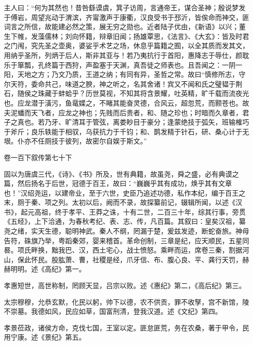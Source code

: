\documentclass[12pt,UTF8]{ctexbook}
\begin{document}
主人曰：“何为其然也！昔咎繇谟虞，箕子访周，言通帝王，谋合圣神；殷说梦发于傅岩，周望兆动于渭滨，齐甯激声于康衢，汉良受书于邳沂，皆俟命而神交，匪词言之所信，故能建必然之策，展无穷之勋也。近者陆子优由，《新语》以兴；董生下帷，发藻儒林；刘向怀籍，辩章旧闻；扬雄覃思，《法言》、《大玄》：皆及时君之门闱，究先圣之壶奥，婆娑乎术艺之场，休息乎篇籍之囿，以全其质而发其文，用纳乎圣所，列炳于后人，斯非其亚与！若乃夷抗行于首阳，惠降志于辱仕，颜耽乐于箪瓢，孔终篇于西狩，声盈塞于天渊，真吾徒之师表也。且吾闻之：一阴一阳，天地之方；乃文乃质，王道之纳；有同有异，圣哲之常。故曰“慎修所志，守尔天符，委命共己，味道之腴，神之听之，名其舍诸！宾又不闻和氏之璧韫于荆石，随侯之珠藏于蚌蛤乎？历世莫视，不知其将含景耀，吐英精，旷千载而流夜光也。应龙潜于潢污，鱼鼋媟之，不睹其能奋灵德，合风云，超忽荒，而颢苍也。故夫泥蟠而天飞者，应龙之神也；先贱而后贵者，和、随之珍也；时暗而久章者，君子之真也。若乃牙、旷清耳于管弦，离娄眇目于豪分；逢蒙绝技于弧矢，班输榷巧于斧斤；良乐轶能于相驭，乌获抗力于千钧；和、鹊发精于针石，研、桑心计于无垠。仆亦不任厕技于彼列，故密尔自娱于斯文。”





卷一百下叙传第七十下



固以为唐虞三代，《诗》、《书》所及，世有典籍，故虽尧，舜之盛，必有典谟之篇，然后扬名于后世，冠德于百王，故曰：“巍巍乎其有成功，焕乎其有文章也！”汉绍尧运，以建帝业，至于六世，史臣乃追述功德，私作本纪，编于百王之末，厕于秦、项之列。太初以后，阙而不录，故探纂前记，辍辑所闻，以述《汉书》，起元高祖，终于孝平、王莽之诛，十有二世，二百三十年，综其行事，旁贯《五经》，上下洽通，为春秋考纪、表、志、传，凡百篇。其叙曰：皇矣汉祖，纂尧之绪，实天生德，聪明神武。秦人不纲，罔漏于楚，爰兹发迹，断蛇奋旅。神母告符，硃旗乃举，粤蹈秦郊，婴来稽首。革命创制，三章是纪，应天顺民，五星同晷。项氏畔换，黜我巴、汉，西土宅心，战士愤怒。乘畔而运，席卷三秦，割据河山，保此怀民。股肱萧、曹，社稷是经，爪牙信、布、腹心良、平、龚行天罚，赫赫明明。述《高纪》第一。



孝惠短世，高世称制，罔顾天显，吕宗以败。述《惠纪》第二，《高后纪》第三。



太宗穆穆，允恭玄默，化民以躬，帅下以德，农不供贡，罪不收孥，宫不新馆，陵不崇墓。我德如风，民应如草，国富刑清，登我汉道。述《文纪》第四。



孝景莅政，诸侯方命，克伐七国，王室以定。匪怠匪荒，务在农桑，著于甲令，民用宁康。述《景纪》第五。
\end{document}
